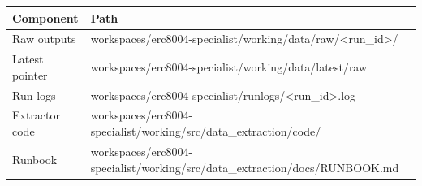 \begin{tabular}{lp{9cm}}\hline
Component & Path \\ \hline
Raw outputs & workspaces/erc8004-specialist/working/data/raw/\textless{}run\_id\textgreater{}/ \\ 
Latest pointer & workspaces/erc8004-specialist/working/data/latest/raw \\ 
Run logs & workspaces/erc8004-specialist/runlogs/\textless{}run\_id\textgreater{}.log \\ 
Extractor code & workspaces/erc8004-specialist/working/src/data\_extraction/code/ \\ 
Runbook & workspaces/erc8004-specialist/working/src/data\_extraction/docs/RUNBOOK.md \\ 
\hline\end{tabular}
